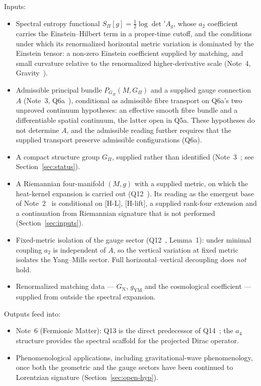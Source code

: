 \documentclass[11pt,a4paper]{article}
\theoremstyle{definition}
\newcommand{\GN}{G_{\mathrm{N}}}
\newcommand{\gYM}{g_{\mathrm{YM}}}
\newcommand{\SPI}{S_\Pi}
\newcommand{\Gpi}{G_\Pi}
\begin{document}
    Inputs:
    \begin{itemize}
      \item Spectral entropy functional $\SPI[g] = \tfrac{1}{2}\log\det' A_g$, whose $a_2$ coefficient carries
      the Einstein--Hilbert term in a proper-time cutoff, and the conditions under which its renormalized
      horizontal metric variation is dominated by the Einstein tensor: a non-zero Einstein coefficient supplied by
      matching, and small curvature relative to the renormalized higher-derivative scale (Note~4,
      Gravity~\cite{Beau2026h}).
      \item Admissible principal bundle $P_{\Gpi}(M, \Gpi)$ and a supplied gauge connection $A$
      (Note~3, Q6a~\cite{Beau2026q6a}), conditional as admissible fibre transport on Q6a's two
      unproved continuum hypotheses: an effective smooth fibre bundle and a differentiable spatial
      continuum, the latter open in Q5a.
      These hypotheses do not determine $A$, and the admissible reading further requires that the
      supplied transport preserve admissible configurations (Q6a).
      \item A compact structure group $\Gpi$, supplied rather than identified
      (Note~3~\cite{Beau2026gsnote}; see Section~\ref{sec:status}).
      \item A Riemannian four-manifold $(M,g)$ with a supplied metric, on which the heat-kernel expansion is
      carried out (Q12~\cite{Beau2026q12}).
      Its reading as the emergent base of Note~2~\cite{Beau2026egnote} is conditional on [H-L], [H-lift], a
      supplied rank-four extension and a continuation from Riemannian signature that is not performed
      (Section~\ref{sec:inputs}).
      \item Fixed-metric isolation of the gauge sector (Q12~\cite{Beau2026q12}, Lemma~1): under
      minimal coupling $a_2$ is independent of $A$, so the vertical variation at fixed metric
      isolates the Yang--Mills sector. Full horizontal--vertical decoupling does \emph{not} hold.
      \item Renormalized matching data --- $\GN$, $\gYM$ and the cosmological coefficient ---
      supplied from outside the spectral expansion.
    \end{itemize}

    \noindent Outputs feed into:
    \begin{itemize}
      \item Note~6 (Fermionic Matter): Q13 is the direct predecessor of Q14~\cite{Beau2026q14};
      the $a_4$ structure
      provides the spectral scaffold for the projected Dirac operator.
      \item Phenomenological applications, including gravitational-wave phenomenology, once both the geometric
      and the gauge sectors have been continued to Lorentzian signature (Section~\ref{sec:open-hyp}).
    \end{itemize}
\end{document}
